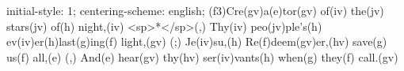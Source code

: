initial-style: 1;
centering-scheme: english;
(f3)Cre(gv)a(e)tor(gv) of(iv) the(jv) stars(jv) of(h) night,(iv) <sp>*</sp>(,)
Thy(iv) peo(jv)ple's(h) ev(iv)er(h)last(g)ing(f) light,(gv) (;)
Je(iv)su,(h) Re(f)deem(gv)er,(hv) save(g) us(f) all,(e) (,)
And(e) hear(gv) thy(hv) ser(iv)vants(h) when(g) they(f) call.(gv)
